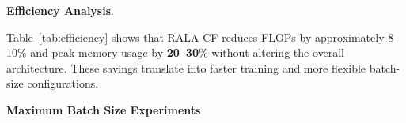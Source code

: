 \documentclass[runningheads]{llncs}
\begin{document}
\noindent \textbf{Efficiency Analysis}.

\begin{table}[h!]
\caption{Efficiency comparison between ChangeFormer and RALA-ChangeFormer ($256\times256$ inputs, batch size 16) \cite{acuna2026efficient}.}
\label{tab:efficiency}
\centering
{}
\end{table}

\noindent Table~\ref{tab:efficiency} shows that RALA-CF reduces FLOPs by
approximately 8--10\% and peak memory usage by \textbf{20--30}\% without
altering the overall architecture. These savings translate into faster training
and more flexible batch-size configurations.

\noindent \textbf{Maximum Batch Size Experiments}

\begin{table}[h!]
\caption{Maximum batch size before OOM for different input resolutions. VRAM limit: 34--36 GB (A100 40 GB VRAM GPU) \cite{acuna2026efficient}.}
\label{tab:batch_multires}
\centering
{}
\end{table}
\end{document}
